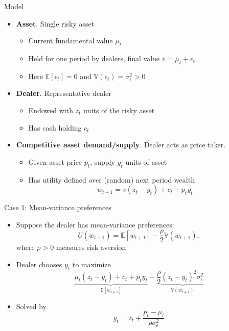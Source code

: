 \documentclass[english,10pt]{beamer}
\begin{document}
\begin{frame}{Model}
	\begin{itemize}
		\item \textbf{Asset}. Single risky asset
		\begin{itemize}
			\item Current fundamental value $\mu_t$
			\item Held for one period by dealers, final value $v=\mu_t + \epsilon_t$
			\item Here $\mathbb{E}[\epsilon_t] = 0$ and $\mathbb{V}(\epsilon_{t})=\sigma^2_\epsilon > 0$
		\end{itemize}
		\item \textbf{Dealer}. Representative dealer
		\begin{itemize}
			\item Endowed with $z_t$ units of the risky asset
			\item Has cash holding $c_t$
		\end{itemize}
		\item \textbf{Competitive asset demand/supply}. Dealer acts as price taker.
		\begin{itemize}
			\item Given asset price $p_t$, supply $y_t$ units of asset
			\item Has utility defined over (random) next period wealth
			\[
			w_{t+1} = v(z_t - y_t) + c_t + p_t y_t
			\]
		\end{itemize}
	\end{itemize}
\end{frame}


\begin{frame}{Case 1: Mean-variance preferences}
	\begin{itemize}
		\item Suppose the dealer has mean-variance preferences:
		\[
		U(w_{t+1})=\mathbb{E}[w_{t+1}] - \frac{\rho}{2} \mathbb{V}(w_{t+1}),
		\]
		where $\rho>0$ measures risk aversion
		\item Dealer chooses $y_t$ to maximize
		\[
		\underbrace{\mu_t(z_t-y_t) + c_t + p_t y_t}_{\mathbb{E}[w_{t+1}] } - \frac{\rho}{2} \underbrace{(z_t -y_t)^2 \sigma^2_\epsilon}_{ \mathbb{V}(w_{t+1})}
		\]
		\item Solved by 
			\[
			y_t = z_t + \frac{p_t-\mu_t}{\rho \sigma^2_\epsilon}
			\]
	\end{itemize}
\end{frame}
\end{document}
